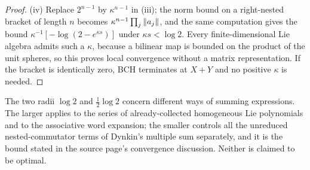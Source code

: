 \begin{proof}
(iv) Replace $2^{n-1}$ by $\kappa^{n-1}$ in (iii); the norm bound on a
right-nested bracket of length $n$ becomes $\kappa^{n-1}\prod_j\left\lVert a_j\right\rVert$,
and the same computation gives the bound $\kappa^{-1}[-\log(2-e^{\kappa s})]$
under $\kappa s<\log2$. Every finite-dimensional Lie algebra admits such a
$\kappa$, because a bilinear map is bounded on the product of the unit
spheres, so this proves local convergence without a matrix representation.
If the bracket is identically zero, BCH terminates at $X+Y$ and no
positive $\kappa$ is needed.
\end{proof}

The two radii $\log2$ and $\tfrac12\log2$ concern different ways of summing
expressions. The larger applies to the series of already-collected
homogeneous Lie polynomials and to the associative word expansion; the
smaller controls all the unreduced nested-commutator terms of Dynkin's
multiple sum separately, and it is the bound stated in the source page's
convergence discussion. Neither is claimed to be optimal.

